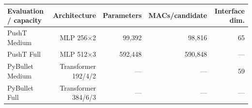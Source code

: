 \begin{tabular}{lrrrr}
\toprule
Evaluation / capacity & Architecture & Parameters & MACs/candidate & Interface dim. \\
\midrule
PushT Medium & MLP 256$\times$2 & 99,392 & 98,816 & 65 \\
PushT Full & MLP 512$\times$3 & 592,448 & 590,848 & --- \\
PyBullet Medium & Transformer 192/4/2 & --- & --- & 59 \\
PyBullet Full & Transformer 384/6/3 & --- & --- & --- \\
\bottomrule
\end{tabular}
